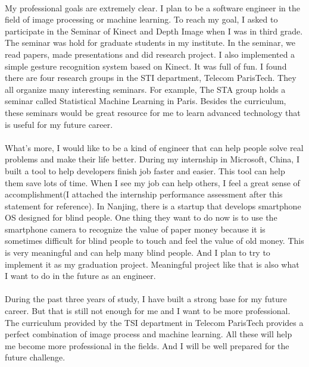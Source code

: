 \documentclass[a4paper]{article}
\begin{document}
\paragraph{}
My professional goals are extremely clear. I plan to be a software engineer in the field of image processing or machine learning. To reach my goal, I asked to participate in the Seminar of Kinect and Depth Image when I was in third grade. The seminar was hold for graduate students in my institute. In the seminar, we read papers, made presentations and did research project. I also implemented a simple gesture recognition system based on Kinect. It was full of fun. I found there are four research groups in the STI department, Telecom ParisTech. They all organize many interesting seminars. For example, The STA group holds a seminar called Statistical Machine Learning in Paris. Besides the curriculum, these seminars would be great resource for me to learn advanced technology that is useful for my future career. 
\paragraph{}
What's more, I would like to be a kind of engineer that can help people solve real problems and make their life better. During my internship in Microsoft, China, I built a tool to help developers finish job faster and easier. This tool can help them save lots of time. When I see my job can help others, I feel a great sense of accomplishment(I attached the internship performance assessment after this statement for reference). In Nanjing, there is a startup that develops smartphone OS designed for blind people. One thing they want to do now is to use the smartphone camera to recognize the value of paper money because it is sometimes difficult for blind people to touch and feel the value of old money. This is very meaningful and can help many blind people. And I plan to try to implement it as my graduation project. Meaningful project like that is also what I want to do in the future as an engineer.
\paragraph{}   
During the past three years of study, I have built a strong base for my future career. But that is still not enough for me and I want to be more professional. The curriculum provided by the TSI department in Telecom ParisTech provides a perfect combination of image process and machine learning. All these will help me become more professional in the fields. And I will be well prepared for the future challenge.
\end{document}
